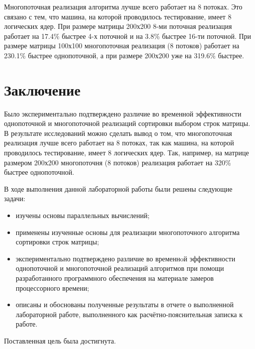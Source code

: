 \documentclass[a4paper,14pt, unknownkeysallowed]{extreport}
\begin{document}
Многопоточная реализация алгоритма лучше всего работает на 8 потоках. Это связано с тем, что машина, на которой проводилось тестирование, имеет 8 логических ядер. При размере матрицы 200х200 8-ми поточная реализация работает на 17.4\% быстрее 4-х поточной и на 3.8\% быстрее 16-ти поточной. При размере матрицы 100х100 многопоточная реализация (8 потоков) работает на 230.1\% быстрее однопоточной, а при размере 200х200 уже на 319.6\% быстрее.



 

\chapter*{Заключение}

Было экспериментально подтверждено различие во временной эффективности однопоточной и многопоточной реализаций сортировки выбором строк матрицы. В результате исследований можно сделать вывод о том, что многопоточная реализация лучше всего работает на 8 потоках, так как машина, на которой проводилось тестирование, имеет 8 логических ядер. Так, например, на матрице размером 200х200 многопоточня (8 потоков) реализация работает на 320\% быстрее однопоточной.

\vspace{5mm}

В ходе выполнения данной лабораторной работы были решены следующие задачи:
\begin{itemize}
	\item изучены основы параллельных вычислений;
	\item применены изученные основы для реализации многопоточного алгоритма сортировки строк матрицы;
	\item экспериментально подтверждено различие во временнoй эффективности однопоточной и многопоточной реализаций алгоритмов при помощи разработанного программного обеспечения на материале замеров процессорного времени;
	\item описаны и обоснованы полученные результаты в отчете о выполненной лабораторной работе, выполненного как расчётно-пояснительная записка к работе.
\end{itemize}

Поставленная цель была достигнута.
\end{document}
